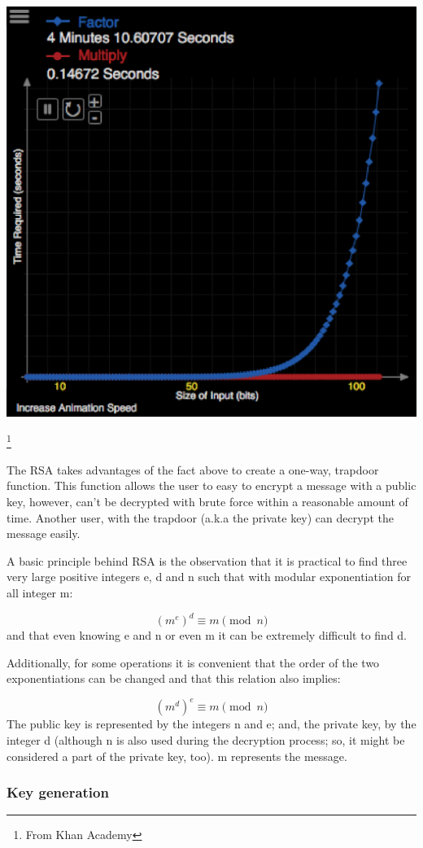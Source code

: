 \documentclass[]{article}
\begin{document}
\centerline{ \includegraphics[scale=0.20]{time_complex}} \footnote{From Khan Academy}

The RSA takes advantages of the fact above to create a one-way, trapdoor function. This function allows the user to easy to encrypt a message with a public key, however, can't be decrypted with brute force within a reasonable amount of time. Another user, with the trapdoor (a.k.a the private key) can decrypt the message easily. 

A basic principle behind RSA is the observation that it is practical to find three very large positive integers e, d and n such that with modular exponentiation for all integer m:

\[ (m^{e})^{d}\equiv m{\pmod {n}}\]
and that even knowing e and n or even m it can be extremely difficult to find d.

Additionally, for some operations it is convenient that the order of the two exponentiations can be changed and that this relation also implies:

\[(m^{d})^{e}\equiv m{\pmod {n}}\]
The public key is represented by the integers n and e; and, the private key, by the integer d (although n is also used during the decryption process; so, it might be considered a part of the private key, too). m represents the message.

\subsubsection{Key generation}
\end{document}
